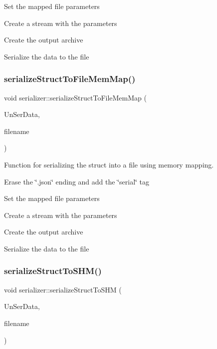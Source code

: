 Set the mapped file parameters

Create a stream with the parameters

Create the output archive

Serialize the data to the file \mbox{\label{classserializer_ac313f0009f2a0612534248e408287cb2}} 
\subsubsection{\texorpdfstring{serialize\+Struct\+To\+File\+Mem\+Map()}{serializeStructToFileMemMap()}\hspace{0.1cm}{\footnotesize\ttfamily [2/2]}}
{\footnotesize\ttfamily void serializer\+::serialize\+Struct\+To\+File\+Mem\+Map (\begin{DoxyParamCaption}\item[{\hyperlink{structEXMPLE__s}{E\+X\+M\+P\+L\+E\+\_\+s}}]{Un\+Ser\+Data,  }\item[{string}]{filename }\end{DoxyParamCaption})}



Function for serializing the struct into a file using memory mapping. 

Erase the \char`\"{}.\+json\char`\"{} ending and add the \char`\"{}serial\char`\"{} tag

Set the mapped file parameters

Create a stream with the parameters

Create the output archive

Serialize the data to the file \mbox{\label{classserializer_a80bfb108b2cab0ec030c32a4d6aa9ad3}} 
\subsubsection{\texorpdfstring{serialize\+Struct\+To\+S\+H\+M()}{serializeStructToSHM()}\hspace{0.1cm}{\footnotesize\ttfamily [1/2]}}
{\footnotesize\ttfamily void serializer\+::serialize\+Struct\+To\+S\+HM (\begin{DoxyParamCaption}\item[{\hyperlink{structUMGR__s}{U\+M\+G\+R\+\_\+s}}]{Un\+Ser\+Data,  }\item[{string}]{filename }\end{DoxyParamCaption})}



